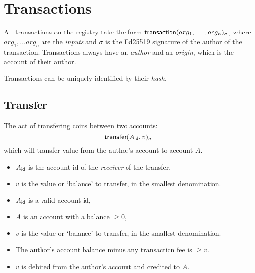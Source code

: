 \section{Transactions}
\label{s:transactions}

All transactions on the registry take the form $\mathsf{transaction}\lparen arg_1, \ldots,
arg_n\rparen_\sigma$, where $arg_1, \ldots arg_n$ are the \emph{inputs} and $\sigma$ is the
\textsf{Ed25519} signature of the author of the transaction. Transactions
always have an \emph{author} and an \emph{origin}, which is the account of
their author.

Transactions can be uniquely identified by their \emph{hash}.

\subsection{Transfer}
The act of transfering coins between two accounts:
\[
    \mathsf{transfer}\lparen A_{\mathsf{id}}, v\rparen_\sigma
\]
which will transfer value from the author's account to account $A$.

\begin{itemize}
    \item $A_{\mathsf{id}}$ is the account id of the \emph{receiver} of the transfer,
    \item $v$ is the value or `balance' to transfer, in the smallest denomination.
\end{itemize}
\validation
\begin{itemize}
    \item $A_{\mathsf{id}}$ is a valid account id,
    \item $A$ is an account with a balance $\geq 0$,
    \item $v$ is the value or `balance' to transfer, in the smallest denomination.
    \item The author's account balance minus any transaction fee is $\geq v$.
\end{itemize}
\outputs
\begin{itemize}
    \item $v$ is debited from the author's account and credited to $A$.
\end{itemize}

